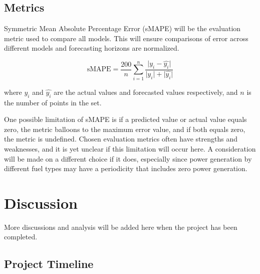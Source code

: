 \documentclass[sigconf]{acmart}
\begin{document}
\subsection{Metrics}
Symmetric Mean Absolute Percentage Error (sMAPE) will be the evaluation metric used to compare all models. This will ensure comparisons of error across different models and forecasting horizons are normalized. 

\begin{equation}
\text{sMAPE} =\frac{200}{n}\sum_{i=1}^{n}\frac{\lvert y_i - \hat{y_i} \rvert}{\lvert y_i \rvert + \lvert \hat{y_i} \rvert}
\end{equation}

where $y_i$ and $\hat{y_i}$ are the actual values and forecasted values respectively, and $n$ is the number of points in the set.

One possible limitation of sMAPE is if a predicted value or actual value equals zero, the metric balloons to the maximum error value, and if both equals zero, the metric is undefined. Chosen evaluation metrics often have strengths and weaknesses, and it is yet unclear if this limitation will occur here. A consideration will be made on a different choice if it does, especially since power generation by different fuel types may have a periodicity that includes zero power generation.

\section{Discussion}


More discussions and analysis will be added here when the project has been completed.

\subsection{Project Timeline}
\end{document}

